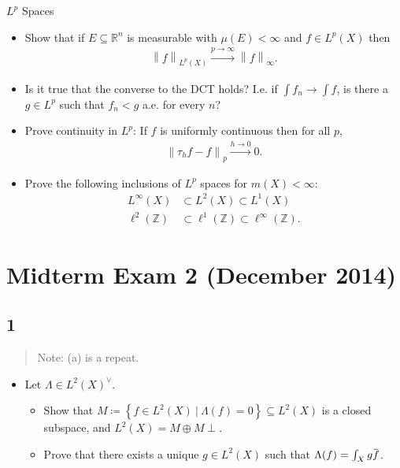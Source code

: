 \(L^p\) Spaces

\begin{itemize}
\tightlist
\item
  Show that if \(E\subseteq {\mathbb{R}}^n\) is measurable with
  \(\mu(E) < \infty\) and \(f\in L^p(X)\) then
  \begin{align*}{\left\lVert {f} \right\rVert}_{L^p(X)} \overset{p\to\infty}\to {\left\lVert {f} \right\rVert}_\infty.\end{align*}
\item
  Is it true that the converse to the DCT holds? I.e. if
  \(\int f_n \to \int f\), is there a \(g\in L^p\) such that \(f_n < g\)
  a.e. for every \(n\)?
\item
  Prove continuity in \(L^p\): If \(f\) is uniformly continuous then for
  all \(p\),
  \begin{align*}{\left\lVert {\tau_h f - f} \right\rVert}_p \overset{h\to 0}\to 0.\end{align*}
\item
  Prove the following inclusions of \(L^p\) spaces for
  \(m(X) < \infty\):
  \begin{align*}
  L^\infty(X) &\subset L^2(X) \subset L^1(X) \\
  \ell^2({\mathbb{Z}}) &\subset \ell^1({\mathbb{Z}}) \subset \ell^\infty({\mathbb{Z}})
  .\end{align*}
\end{itemize}

\hypertarget{midterm-exam-2-december-2014}{%
\section{Midterm Exam 2 (December
2014)}\label{midterm-exam-2-december-2014}}

\hypertarget{section}{%
\subsection{1}\label{section}}

\begin{quote}
Note: (a) is a repeat.
\end{quote}

\begin{itemize}
\tightlist
\item
  Let \(\Lambda\in L^2(X)^\vee\).

  \begin{itemize}
  \tightlist
  \item
    Show that
    \(M\coloneqq\left\{{f\in L^2(X) {~\mathrel{\Big|}~}\Lambda(f) = 0}\right\} \subseteq L^2(X)\)
    is a closed subspace, and \(L^2(X) = M \oplus M\perp\).
  \item
    Prove that there exists a unique \(g\in L^2(X)\) such that
    \(\Lambda(f) = \int_X g \mkern 1.5mu\overline{\mkern-1.5muf\mkern-1.5mu}\mkern 1.5mu\).
  \end{itemize}
\end{itemize}

